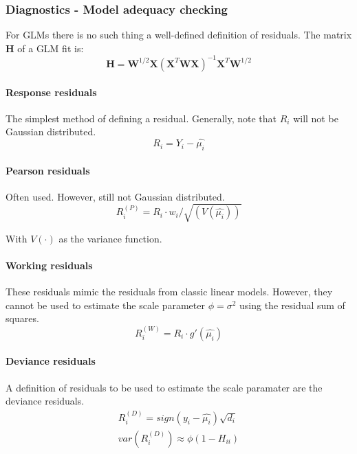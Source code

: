 \subsubsection{Diagnostics -  Model adequacy checking}
For GLMs there is no such thing a well-defined definition of residuals. The matrix $\bm{H}$ of a GLM fit is:
\begin{equation*}
\bm{H}=\bm{W}^{1/2}\bm{X}(\bm{X}^T\bm{W}\bm{X})^{-1}\bm{X}^T\bm{W}^{1/2}
\end{equation*}

\paragraph{Response residuals} The simplest method of defining a residual. Generally, note that $R_i$ will not be Gaussian distributed. 
\begin{equation*}
R_i = Y_i - \hat{\mu_i}
\end{equation*}

\paragraph{Pearson residuals}
Often used. However, still not Gaussian distributed.
\begin{equation*}
R_i^{(P)} = R_i \cdot w_i/\sqrt{(V(\hat{\mu_i}))}
\end{equation*}

With $V(\cdot)$ as the variance function.

\paragraph{Working residuals}
These residuals mimic the residuals from classic linear models. However, they cannot be used to estimate the scale parameter $\phi = \sigma^2$ using the residual sum of squares. 
\begin{equation*}
R_i^{(W)} = R_i\cdot g'(\hat{\mu_i})
\end{equation*}

\paragraph{Deviance residuals}
A definition of residuals to be used to estimate the scale paramater are the deviance residuals.
\begin{gather*}
R_i^{(D)} = sign(y_i - \hat{\mu_i})\sqrt{d_i} \\
var\left(R_i^{(D)}\right)\approx \phi(1-H_{ii})
\end{gather*}


